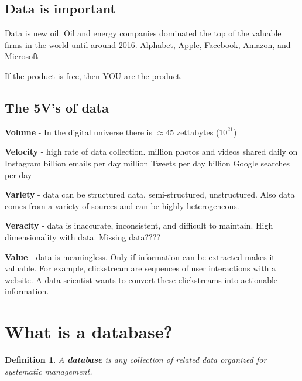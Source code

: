 \documentclass{article}
\newtheorem{definition}{Definition}
\begin{document}
\newpage


 
 \subsection*{Data is important}
\begin{outline}
    \1 Data is new oil.
        \2 Oil and energy companies dominated the top of the valuable firms in the world until around 2016.  
        \3 Alphabet, Apple, Facebook, Amazon, and Microsoft
        
    \2 If the product is free, then YOU are the product.  
    
    
\end{outline}

\subsection*{The 5V's of data}



\begin{outline}[enumerate]
        \1 \textbf{Volume} - In the digital universe there is $\approx 45$ zettabytes ($10^{21}$)

        \1 \textbf{Velocity} - high rate of data collection.
                 million photos and videos shared daily on Instagram
                 billion emails per day
                 million Tweets per day
                 billion Google searches per day
                
                
        \1 \textbf{Variety} - data can be structured data, semi-structured, unstructured.  Also data comes from a variety of sources and can be highly heterogeneous.  


        \1 \textbf{Veracity} - data is inaccurate, inconsistent, and difficult to maintain.  High dimensionality with data.  Missing data????


        \1 \textbf{Value} - data is meaningless.  Only if information can be extracted makes it valuable.  For example, clickstream are sequences of user interactions with a website.  A data scientist wants to convert these clickstreams into actionable information.  
\end{outline}






\section{What is a database?}
\begin{definition}
        A \textbf{database} is any collection of related data organized for systematic management.
\end{definition}
\end{document}
